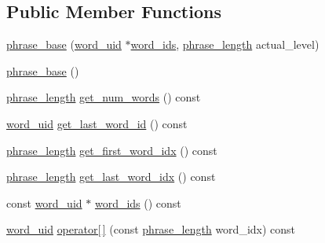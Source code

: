 \subsection*{Public Member Functions}
\begin{DoxyCompactItemize}
\item 
\hyperlink{classuva_1_1smt_1_1bpbd_1_1server_1_1lm_1_1m__grams_1_1phrase__base_a5f5cf6f3a02d35210670fddc3794a5e9}{phrase\+\_\+base} (\hyperlink{namespaceuva_1_1smt_1_1bpbd_1_1server_a6bfe45ba344d65a7fdd7d26156328ddc}{word\+\_\+uid} $\ast$\hyperlink{classuva_1_1smt_1_1bpbd_1_1server_1_1lm_1_1m__grams_1_1phrase__base_a5dc6f9171cf46eb946e30595a24f7d0e}{word\+\_\+ids}, \hyperlink{namespaceuva_1_1smt_1_1bpbd_1_1server_af068a19c2e03116caf3e3827a3e40e35}{phrase\+\_\+length} actual\+\_\+level)
\item 
\hyperlink{classuva_1_1smt_1_1bpbd_1_1server_1_1lm_1_1m__grams_1_1phrase__base_a4a90d74c0471c6138f5998672f813cd1}{phrase\+\_\+base} ()
\item 
\hyperlink{namespaceuva_1_1smt_1_1bpbd_1_1server_af068a19c2e03116caf3e3827a3e40e35}{phrase\+\_\+length} \hyperlink{classuva_1_1smt_1_1bpbd_1_1server_1_1lm_1_1m__grams_1_1phrase__base_a7faa3090e146e171c62c0cd3949aae46}{get\+\_\+num\+\_\+words} () const 
\item 
\hyperlink{namespaceuva_1_1smt_1_1bpbd_1_1server_a6bfe45ba344d65a7fdd7d26156328ddc}{word\+\_\+uid} \hyperlink{classuva_1_1smt_1_1bpbd_1_1server_1_1lm_1_1m__grams_1_1phrase__base_ab903406a8945937eed3fd03b51f425ab}{get\+\_\+last\+\_\+word\+\_\+id} () const 
\item 
\hyperlink{namespaceuva_1_1smt_1_1bpbd_1_1server_af068a19c2e03116caf3e3827a3e40e35}{phrase\+\_\+length} \hyperlink{classuva_1_1smt_1_1bpbd_1_1server_1_1lm_1_1m__grams_1_1phrase__base_acd969e4edb56c1012456e6ba36a6006a}{get\+\_\+first\+\_\+word\+\_\+idx} () const 
\item 
\hyperlink{namespaceuva_1_1smt_1_1bpbd_1_1server_af068a19c2e03116caf3e3827a3e40e35}{phrase\+\_\+length} \hyperlink{classuva_1_1smt_1_1bpbd_1_1server_1_1lm_1_1m__grams_1_1phrase__base_a639c31d8a3591f13e5364721894e0dae}{get\+\_\+last\+\_\+word\+\_\+idx} () const 
\item 
const \hyperlink{namespaceuva_1_1smt_1_1bpbd_1_1server_a6bfe45ba344d65a7fdd7d26156328ddc}{word\+\_\+uid} $\ast$ \hyperlink{classuva_1_1smt_1_1bpbd_1_1server_1_1lm_1_1m__grams_1_1phrase__base_a5dc6f9171cf46eb946e30595a24f7d0e}{word\+\_\+ids} () const 
\item 
\hyperlink{namespaceuva_1_1smt_1_1bpbd_1_1server_a6bfe45ba344d65a7fdd7d26156328ddc}{word\+\_\+uid} \hyperlink{classuva_1_1smt_1_1bpbd_1_1server_1_1lm_1_1m__grams_1_1phrase__base_ab5d137326514b5bf3b54cbd5ecbbdd24}{operator\mbox{[}$\,$\mbox{]}} (const \hyperlink{namespaceuva_1_1smt_1_1bpbd_1_1server_af068a19c2e03116caf3e3827a3e40e35}{phrase\+\_\+length} word\+\_\+idx) const 

\end{DoxyCompactItemize}
